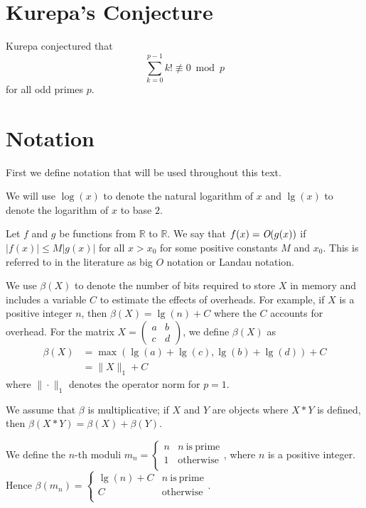 \documentclass[10pt]{article}
\begin{document}
\section{Kurepa's Conjecture}

Kurepa conjectured that \[\sum_{k=0}^{p-1} k!\not\equiv 0 \bmod p\] for all odd primes $p$.

\section{Notation}


First we define notation that will be used throughout this text. 

We will use $\log(x)$ to denote the natural logarithm of $x$ and $\lg(x)$ to denote the logarithm of $x$ to base $2$.

Let $f$ and $g$ be functions from $\mathbb{R}$ to $\mathbb{R}$. We say that $f(x)=\emph{O}(g(x))$ if $\vert f(x)\vert\leq M \vert g(x)\vert$ for all $x>x_0$ for some positive constants $M$ and $x_0$. This is referred to in the literature as big $O$ notation or Landau notation.

We use $\beta(X)$ to denote the number of bits required to store $X$ in memory and includes a variable $C$ to estimate the effects of overheads. For example, if $X$ is a positive integer $n$, then $\beta(X)=\lg(n)+C$ where the $C$ accounts for overhead. For the matrix $X=\begin{pmatrix} a & b\\ c& d\end{pmatrix}$, we define $\beta(X)$ as \begin{align*}\beta(X)&=\max(\lg(a)+\lg(c),\lg(b)+\lg(d))+C\\ &=\|X\|_{1}+C\end{align*} where $\|\cdot\|_{1}$ denotes the operator norm for $p=1$.


 We assume that $\beta$ is multiplicative; if $X$ and $Y$ are objects where $X*Y$ is defined, then $\beta(X*Y)= \beta(X)+\beta(Y)$.

We define the $n$-th moduli $m_n=\begin{cases} n & n \mathrm{\ is \ prime}\\
1 & \mathrm{otherwise}\\ \end{cases}$, where $n$ is a positive integer. Hence $\beta(m_n)=\begin{cases} \lg(n)+C & n \mathrm{\ is \ prime}\\
C & \mathrm{otherwise}\\ \end{cases}$. 
\end{document}
